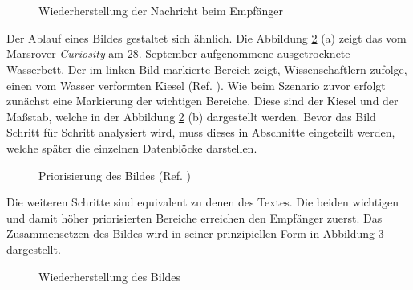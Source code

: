 \begin{figure}[H]
	\centering
	\\
	\\
	\label{fig:chatguiexample}
	\caption{Wiederherstellung der Nachricht beim Empfänger}
\end{figure}

Der Ablauf eines Bildes gestaltet sich ähnlich. Die Abbildung
\ref{fig:marsWaterResidue} (a) zeigt das vom Marsrover \textit{Curiosity}
am $28.$ September aufgenommene ausgetrocknete Wasserbett. Der im
linken Bild markierte Bereich zeigt, Wissenschaftlern zufolge, einen vom Wasser
verformten Kiesel (Ref. \cite{web11}). Wie beim Szenario zuvor erfolgt zunächst
eine Markierung der wichtigen Bereiche. Diese sind der Kiesel und der Maßstab, welche in der
Abbildung \ref{fig:marsWaterResidue} (b) dargestellt werden. Bevor das Bild
Schritt für Schritt analysiert wird, muss dieses in Abschnitte eingeteilt
werden, welche später die einzelnen Datenblöcke darstellen.
 
\begin{figure}[H]
	\centering
	\hfill
	\hfill
	\label{fig:marsWaterResidue}
	\caption[Priorisierung des Bildes]{Priorisierung des Bildes (Ref. \cite{img3})}
\end{figure}

Die weiteren Schritte sind equivalent zu denen des Textes. Die beiden wichtigen
und damit höher priorisierten Bereiche erreichen den Empfänger zuerst.
Das Zusammensetzen des Bildes wird in seiner prinzipiellen Form in
Abbildung \ref{fig:marsWaterResidueEmpfaenger} dargestellt.

\begin{figure}[H]
	\centering
	\hfill
	\hfill
	\label{fig:marsWaterResidueEmpfaenger}
	\caption{Wiederherstellung des Bildes}
\end{figure}